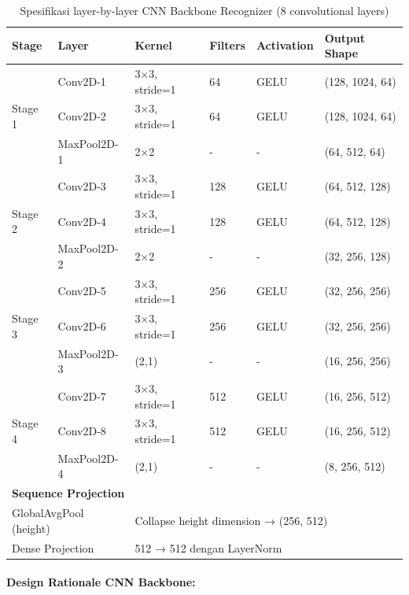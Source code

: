 \begin{table}[H]
\centering
\caption{Spesifikasi layer-by-layer CNN Backbone Recognizer (8 convolutional layers)}
\label{tab:appendix-recognizer-cnn}
\scriptsize
\begin{tabular}{|l|l|l|l|l|l|}
\hline
\textbf{Stage} & \textbf{Layer} & \textbf{Kernel} & \textbf{Filters} & \textbf{Activation} & \textbf{Output Shape} \\
\hline
\multirow{3}{*}{Stage 1} & Conv2D-1 & 3×3, stride=1 & 64 & GELU & (128, 1024, 64) \\
\cline{2-6}
 & Conv2D-2 & 3×3, stride=1 & 64 & GELU & (128, 1024, 64) \\
\cline{2-6}
 & MaxPool2D-1 & 2×2 & - & - & (64, 512, 64) \\
\hline
\multirow{3}{*}{Stage 2} & Conv2D-3 & 3×3, stride=1 & 128 & GELU & (64, 512, 128) \\
\cline{2-6}
 & Conv2D-4 & 3×3, stride=1 & 128 & GELU & (64, 512, 128) \\
\cline{2-6}
 & MaxPool2D-2 & 2×2 & - & - & (32, 256, 128) \\
\hline
\multirow{3}{*}{Stage 3} & Conv2D-5 & 3×3, stride=1 & 256 & GELU & (32, 256, 256) \\
\cline{2-6}
 & Conv2D-6 & 3×3, stride=1 & 256 & GELU & (32, 256, 256) \\
\cline{2-6}
 & MaxPool2D-3 & (2,1) & - & - & (16, 256, 256) \\
\hline
\multirow{3}{*}{Stage 4} & Conv2D-7 & 3×3, stride=1 & 512 & GELU & (16, 256, 512) \\
\cline{2-6}
 & Conv2D-8 & 3×3, stride=1 & 512 & GELU & (16, 256, 512) \\
\cline{2-6}
 & MaxPool2D-4 & (2,1) & - & - & (8, 256, 512) \\
\hline
\multicolumn{6}{|l|}{\textbf{Sequence Projection}} \\
\hline
\multicolumn{2}{|l|}{GlobalAvgPool (height)} & \multicolumn{4}{l|}{Collapse height dimension → (256, 512)} \\
\hline
\multicolumn{2}{|l|}{Dense Projection} & \multicolumn{4}{l|}{512 → 512 dengan LayerNorm} \\
\hline
\end{tabular}
\end{table}

\paragraph{Design Rationale CNN Backbone:}


